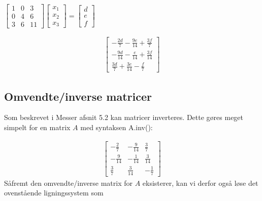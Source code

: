 \documentclass[letterpaper,10pt,english]{jupyterBook}
\begin{document}
\(\displaystyle \left[\begin{matrix}1 & 0 & 3\\0 & 4 & 6\\3 & 6 & 11\end{matrix}\right] \displaystyle \left[\begin{matrix}x_{1}\\x_{2}\\x_{3}\end{matrix}\right] = \displaystyle \left[\begin{matrix}d\\e\\f\end{matrix}\right]\)

\begin{sphinxVerbatim}[commandchars=\\\{\}]
     
  \PYG{p}{[}  \PYG{p}{]}

\end{sphinxVerbatim}
\begin{equation*}
\begin{split}\displaystyle \left[\begin{matrix}- \frac{2 d}{7} - \frac{9 e}{14} + \frac{3 f}{7}\\- \frac{9 d}{14} - \frac{e}{14} + \frac{3 f}{14}\\\frac{3 d}{7} + \frac{3 e}{14} - \frac{f}{7}\end{matrix}\right]\end{split}
\end{equation*}

\subsection{Omvendte/inverse matricer}
\label{\detokenize{notebooks/sympy/Notebook_LinAlg1_5:omvendte-inverse-matricer}}
Som beskrevet i Messer afsnit 5.2 kan matricer inverteres. Dette gøres meget simpelt for en matrix \(A\) med syntaksen A.inv():

\begin{sphinxVerbatim}[commandchars=\\\{\}]
\end{sphinxVerbatim}
\begin{equation*}
\begin{split}\displaystyle \left[\begin{matrix}- \frac{2}{7} & - \frac{9}{14} & \frac{3}{7}\\- \frac{9}{14} & - \frac{1}{14} & \frac{3}{14}\\\frac{3}{7} & \frac{3}{14} & - \frac{1}{7}\end{matrix}\right]\end{split}
\end{equation*}
Såfremt den omvendte/inverse matrix for \(A\) eksisterer, kan vi derfor også løse det ovenstående ligningssystem som
\end{document}
